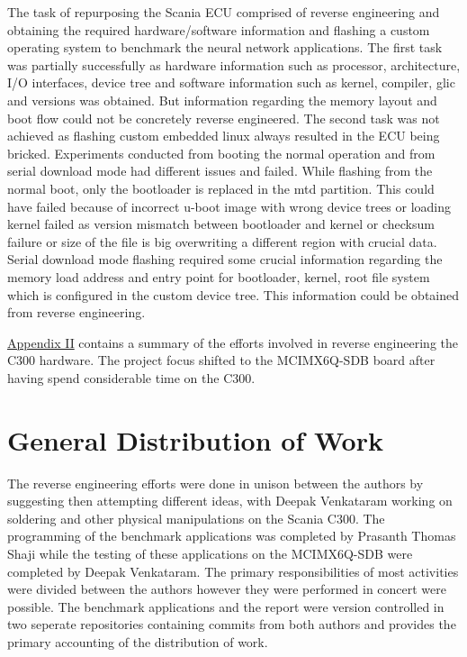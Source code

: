 The task of repurposing the Scania ECU comprised of reverse engineering and obtaining the required hardware/software information and flashing a custom operating system to benchmark the neural network applications. The first task was partially successfully as hardware information such as processor, architecture, I/O interfaces, device tree and software information such as kernel, compiler, glic and versions was obtained. But information regarding the memory layout and boot flow could not be concretely reverse engineered. The second task was not achieved as flashing custom embedded linux always resulted in the ECU being bricked. Experiments conducted from booting the normal operation and from serial download mode had different issues and failed. While flashing from the normal boot, only the bootloader is replaced in the mtd partition. This could have failed because of incorrect u-boot image with wrong device trees or loading kernel failed as version mismatch between bootloader and kernel or checksum failure or size of the file is big overwriting a different region with crucial data. Serial download mode flashing required some crucial information regarding the memory load address and entry point for bootloader, kernel, root file system which is configured in the custom device tree. This information could be obtained from reverse engineering.

\hyperref[rtc-c300]{Appendix II} contains a summary of the efforts involved in reverse engineering the C300 hardware. The project focus shifted to the MCIMX6Q-SDB board after having spend considerable time on the C300.

\section{General Distribution of Work}

The reverse engineering efforts were done in unison between the authors by suggesting then attempting different ideas, with Deepak Venkataram working on soldering and other physical manipulations on the Scania C300. The programming of the benchmark applications was completed by Prasanth Thomas Shaji while the testing of these applications on the MCIMX6Q-SDB were completed by Deepak Venkataram. The primary responsibilities of most activities were divided between the authors however they were performed in concert were possible. The benchmark applications and the report were version controlled in two seperate repositories containing commits from both authors and provides the primary accounting of the distribution of work.

